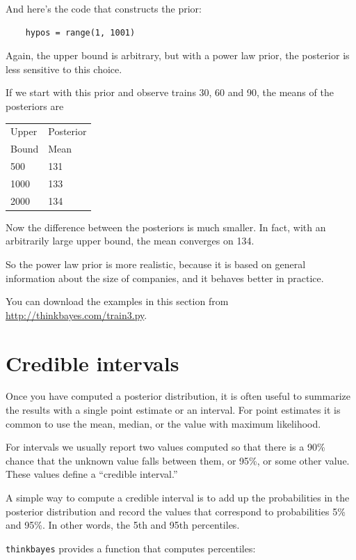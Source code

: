 \documentclass[12pt]{book}
\begin{document}
And here's the code that constructs the prior:

\begin{verbatim}
    hypos = range(1, 1001)
\end{verbatim}

Again, the upper bound is arbitrary, but with a power law
prior, the posterior is less sensitive to this choice.

If we start with this prior and observe trains 30, 60 and 90,
the means of the posteriors are

  \begin{tabular}{|l|l|}
  \hline
  Upper & Posterior \\
  Bound & Mean \\
  \hline
  500 & 131 \\
  1000 & 133 \\
  2000 & 134 \\
  \hline
  \end{tabular}

Now the difference between the posteriors is much smaller.  In fact,
with an arbitrarily large upper bound, the mean converges on 134.

So the power law prior is more realistic, because it is based on
general information about the size of companies, and it
behaves better in practice.

You can download the examples in this section from
\url{http://thinkbayes.com/train3.py}.

\section{Credible intervals}

Once you have computed a posterior distribution, it is often useful
to summarize the results with a single point estimate or an interval.
For point estimates it is common to use the mean, median, or the
value with maximum likelihood.

For intervals we usually report two values computed
so that there is a 90\% chance that the unknown value falls
between them, or 95\%, or some other value.
These values define a ``credible interval.''

A simple way to compute a credible interval is to add up the
probabilities in the posterior distribution and record the values
that correspond to probabilities 5\% and 95\%.  In other words,
the 5th and 95th percentiles.

\verb"thinkbayes" provides a function that computes percentiles:
\end{document}
